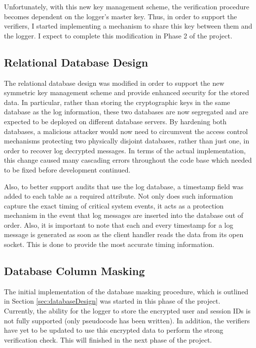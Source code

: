 \documentclass{sig-alternate}
\begin{document}
Unfortunately, with this new key management scheme, the verification procedure becomes dependent on the
logger's master key. Thus, in order to support the verifiers, I started implementing a mechanism to share this key 
between them and the logger. I expect to complete this modification in Phase 2 of the project.

\subsection{Relational Database Design}
The relational database design was modified in order to support the new symmetric key management scheme and provide 
enhanced security for the stored data. In particular, rather than storing the cryptographic keys in the same database as the
log information, these two databases are now segregated and are expected to be deployed on different database servers.
By hardening both databases, a malicious attacker would now need to circumvent the access control 
mechanisms protecting two physically disjoint databases, rather than just one, in order to recover log 
decrypted messages. In terms of the actual implementation, this change caused many cascading errors 
throughout the code base which needed to be fixed before development continued.

Also, to better support audits that use the log database, a timestamp field was added to each table as a required
attribute. Not only does such information capture the exact timing of critical system events, it acts as a protection
mechanism in the event that log messages are inserted into the database out of order. Also, it is important to note that
each and every timestamp for a log message is generated as soon as the client handler reads the data from
its open socket. This is done to provide the most accurate timing information.


\subsection{Database Column Masking}
The initial implementation of the database masking procedure, which is outlined in Section \ref{sec:databaseDesign}
was started in this phase of the project. Currently, the ability for the logger to store the encrypted user and session IDs 
is not fully supported (only pseudocode has been written). In addition, the verifiers have yet to be updated to use 
this encrypted data to perform the strong verification check. This will finished in the next phase of the project.
\end{document}
